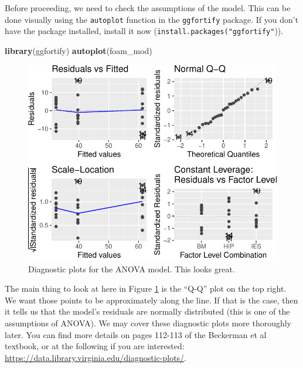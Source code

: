\documentclass[
  a4paperpaper,
]{book}
\newenvironment{Shaded}{\begin{snugshade}}{\end{snugshade}}
\newcommand{\KeywordTok}[1]{\textcolor[rgb]{0.13,0.29,0.53}{\textbf{#1}}}
\newcommand{\NormalTok}[1]{#1}
\begin{document}
Before proceeding, we need to check the assumptions of the model. This can be done visually using the \texttt{autoplot} function in the \texttt{ggfortify} package. If you don't have the package installed, install it now (\texttt{install.packages("ggfortify"})).

\begin{Shaded}
\begin{Highlighting}[]
\KeywordTok{library}\NormalTok{(ggfortify)}
\KeywordTok{autoplot}\NormalTok{(foam\_mod)}
\end{Highlighting}
\end{Shaded}

\begin{figure}

{\centering \includegraphics{BB852_files/figure-latex/diagnostic-1} 

}

\caption{Diagnostic plots for the ANOVA model. This looks great.}\label{fig:diagnostic}
\end{figure}

The main thing to look at here in Figure \ref{fig:diagnostic} is the ``Q-Q'' plot on the top right. We want those points to be approximately along the line. If that is the case, then it tells us that the model's residuals are normally distributed (this is one of the assumptions of ANOVA). We may cover these diagnostic plots more thoroughly later. You can find more details on pages 112-113 of the Beckerman et al textbook, or at the following if you are interested: \url{https://data.library.virginia.edu/diagnostic-plots/}.
\end{document}
